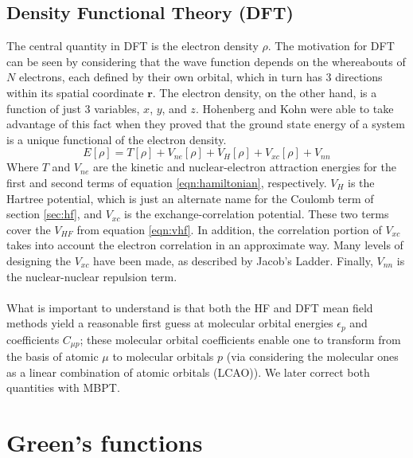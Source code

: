 \documentclass[12pt]{caltech_thesis}
\begin{document}
\subsection{Density Functional Theory (DFT)}
The central quantity in DFT is the electron density $\rho $. The motivation for DFT can be seen by considering that the wave function depends on the whereabouts of $N$ electrons, each defined by their own orbital, which in turn has 3 directions within its spatial coordinate $\textbf{r}$. The electron density, on the other hand, is a function of just 3 variables, $x$, $y$, and $z$. Hohenberg and Kohn were able to take advantage of this fact when they proved that the ground state energy of a system is a unique functional of the electron density. 
\begin{equation}
    E[\rho ] = T[\rho ] + V_{ne}[\rho ] + V_H[\rho ] + V_{xc}[\rho ] + V_{nn}
\end{equation}
Where $T$ and $V_{ne}$ are the kinetic and nuclear-electron attraction energies for the first and second terms of equation \ref{eqn:hamiltonian}, respectively. $V_H$ is the Hartree potential, which is just an alternate name for the Coulomb term of section \ref{sec:hf}, and $V_{xc}$ is the exchange-correlation potential. These two terms cover the $V_{HF}$ from equation \ref{eqn:vhf}. In addition, the correlation portion of $V_{xc}$ takes into account the electron correlation in an approximate way. Many levels of designing the $V_{xc}$ have been made, as described by Jacob's Ladder. \autocite{milman_jacobs_2021} Finally, $V_{nn}$ is the nuclear-nuclear repulsion term.\\\\ What is important to understand is that both the HF and DFT mean field methods yield a reasonable first guess \autocite{bruneval_gw_2021} at molecular orbital energies $\epsilon_{p}$ and coefficients $C_{\mu p}$; these molecular orbital coefficients enable one to transform from the basis of atomic $\mu$ to molecular orbitals $p$ (via considering the molecular ones as a linear combination of atomic orbitals (LCAO)). We later correct both quantities with MBPT.
\section{Green's functions}
\end{document}
